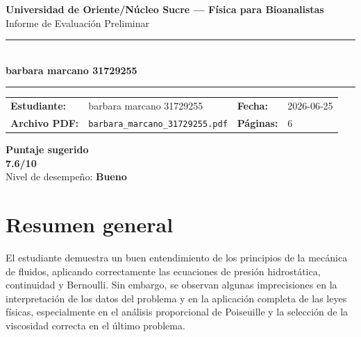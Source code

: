 \documentclass[11pt,a4paper]{article}
\begin{document}
\begin{center}
  {\Large\bfseries\color{azulTitulo} Universidad de Oriente/Núcleo Sucre --- Física para Bioanalistas}\\[4pt]
  {\large Informe de Evaluación Preliminar}\\[12pt]
  \rule{\linewidth}{1.2pt}\\[6pt]
  {\LARGE\bfseries barbara marcano 31729255}\\[4pt]
  \rule{\linewidth}{0.6pt}
\end{center}

\vspace{4pt}
\begin{tcolorbox}[cajaTitulo, title=Datos del informe]
\begin{tabular}{@{}llll@{}}
  \textbf{Estudiante:}  & barbara marcano 31729255  &
  \textbf{Fecha:}       & 2026-06-25 \\[4pt]
  \textbf{Archivo PDF:} & \texttt{barbara\_marcano\_31729255.pdf}  &
  \textbf{Páginas:}     & 6 \\
\end{tabular}
\end{tcolorbox}

\vspace{6pt}
\begin{center}
  \begin{tcolorbox}[
    enhanced,
    colback=white, colframe=desempeno_bueno,
    width=0.62\linewidth,
    boxrule=2pt,
    halign=center, valign=center,
    top=8pt, bottom=8pt,
  ]
    \centering
    {\large\bfseries Puntaje sugerido}\\[6pt]
    {\Huge\bfseries\color{desempeno_bueno} 7.6/10}\\[6pt]
    {\large Nivel de desempeño: \textbf{\color{desempeno_bueno} Bueno}}
  \end{tcolorbox}
\end{center}

\section*{Resumen general}
El estudiante demuestra un buen entendimiento de los principios de la mecánica de fluidos, aplicando correctamente las ecuaciones de presión hidrostática, continuidad y Bernoulli. Sin embargo, se observan algunas imprecisiones en la interpretación de los datos del problema y en la aplicación completa de las leyes físicas, especialmente en el análisis proporcional de Poiseuille y la selección de la viscosidad correcta en el último problema.
\end{document}
